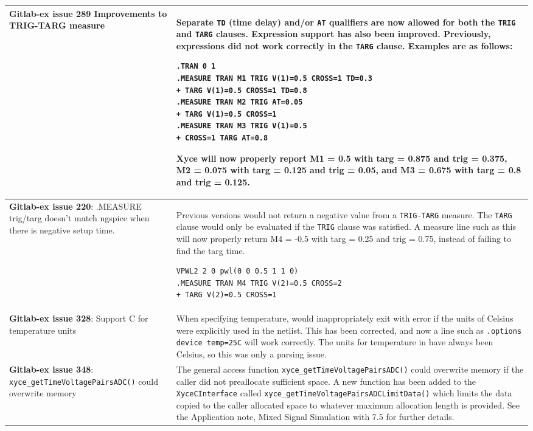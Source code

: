 {\begin{longtable}[h] {>{\raggedright\small}m{2in}|>{\raggedright\let\\\tabularnewline\small}m{3.5in}}
\textbf{Gitlab-ex issue 289} Improvements to TRIG-TARG measure &
Separate \texttt{TD} (time delay) and/or \texttt{AT} qualifiers
are now allowed for both the \texttt{TRIG} and \texttt{TARG} 
clauses.  Expression support has also been improved.  Previously,
expressions did not work correctly in the \texttt{TARG} clause.
Examples are as follows:

\begin{verbatim}
.TRAN 0 1
.MEASURE TRAN M1 TRIG V(1)=0.5 CROSS=1 TD=0.3
+ TARG V(1)=0.5 CROSS=1 TD=0.8
.MEASURE TRAN M2 TRIG AT=0.05 
+ TARG V(1)=0.5 CROSS=1
.MEASURE TRAN M3 TRIG V(1)=0.5
+ CROSS=1 TARG AT=0.8
\end{verbatim}

Xyce will now properly report M1 = 0.5 with targ = 0.875 and
trig = 0.375, M2 = 0.075 with targ = 0.125 and trig = 0.05, and
M3 = 0.675 with targ = 0.8 and trig = 0.125.
\\ \hline 

\textbf{Gitlab-ex issue 220}:  .MEASURE trig/targ doesn't match ngspice
when there is negative setup time. & Previous \Xyce{} versions would
not return a negative value from a \texttt{TRIG-TARG} measure. The 
\texttt{TARG} clause would only be evaluated if the \texttt{TRIG} clause
was satisfied.  A measure line such as this will now properly return 
M4 = -0.5 with targ = 0.25 and trig = 0.75, instead of
failing to find the targ time.

\begin{verbatim}
VPWL2 2 0 pwl(0 0 0.5 1 1 0)
.MEASURE TRAN M4 TRIG V(2)=0.5 CROSS=2
+ TARG V(2)=0.5 CROSS=1
\end{verbatim}
 \\ \hline

\textbf{Gitlab-ex issue 328}:  Support C for temperature units & 
  When specifying temperature, \Xyce{} would inappropriately exit 
  with error if the units of Celsius were explicitly used in the netlist.  
  This has been corrected, and now a line such as \texttt{.options device temp=25C} 
  will work correctly.   The units for temperature in \Xyce{} have always been 
  Celsius, so this was only a parsing issue. \\ \hline

\textbf{Gitlab-ex issue 348}: \texttt{xyce\_getTimeVoltagePairsADC()} could overwrite memory &
  The general access function \texttt{xyce\_getTimeVoltagePairsADC()} could overwrite
  memory if the caller did not preallocate sufficient space.  A new function has been
  added to the \texttt{XyceCInterface} called \texttt{xyce\_getTimeVoltagePairsADCLimitData()}
  which limits the data copied to the caller allocated space to whatever maximum 
  allocation length is provided.  See the Application note, 
  Mixed Signal Simulation with \Xyce{} 7.5 for further details.  \\ \hline


\end{longtable}}
